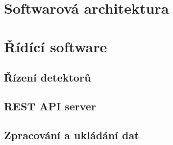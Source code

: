 \section{Softwarová architektura}\label{atlas:sw_arch}
\section{Řídící software}\label{atlas:cont}
\subsection{Řízení detektorů}
\subsection{REST API server}
\subsection{Zpracování a ukládání dat}


